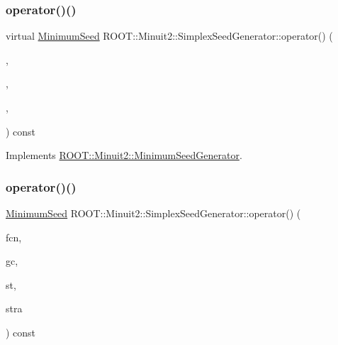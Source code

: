 \subsubsection{\texorpdfstring{operator()()}{operator()()}\hspace{0.1cm}{\footnotesize\ttfamily [4/6]}}
{\footnotesize\ttfamily virtual \mbox{\hyperlink{classROOT_1_1Minuit2_1_1MinimumSeed}{Minimum\+Seed}} R\+O\+O\+T\+::\+Minuit2\+::\+Simplex\+Seed\+Generator\+::operator() (\begin{DoxyParamCaption}\item[{const \mbox{\hyperlink{classROOT_1_1Minuit2_1_1MnFcn}{Mn\+Fcn}} \&}]{,  }\item[{const \mbox{\hyperlink{classROOT_1_1Minuit2_1_1AnalyticalGradientCalculator}{Analytical\+Gradient\+Calculator}} \&}]{,  }\item[{const \mbox{\hyperlink{classROOT_1_1Minuit2_1_1MnUserParameterState}{Mn\+User\+Parameter\+State}} \&}]{,  }\item[{const \mbox{\hyperlink{classROOT_1_1Minuit2_1_1MnStrategy}{Mn\+Strategy}} \&}]{ }\end{DoxyParamCaption}) const\hspace{0.3cm}{\ttfamily [virtual]}}



Implements \mbox{\hyperlink{classROOT_1_1Minuit2_1_1MinimumSeedGenerator_a670b9671c73d7e0d3caa148e82d4b2fa}{R\+O\+O\+T\+::\+Minuit2\+::\+Minimum\+Seed\+Generator}}.

\mbox{\label{classROOT_1_1Minuit2_1_1SimplexSeedGenerator_abce591c5a1e1aa0882dd5b474530efce}} 
\subsubsection{\texorpdfstring{operator()()}{operator()()}\hspace{0.1cm}{\footnotesize\ttfamily [5/6]}}
{\footnotesize\ttfamily \mbox{\hyperlink{classROOT_1_1Minuit2_1_1MinimumSeed}{Minimum\+Seed}} R\+O\+O\+T\+::\+Minuit2\+::\+Simplex\+Seed\+Generator\+::operator() (\begin{DoxyParamCaption}\item[{const \mbox{\hyperlink{classROOT_1_1Minuit2_1_1MnFcn}{Mn\+Fcn}} \&}]{fcn,  }\item[{const \mbox{\hyperlink{classROOT_1_1Minuit2_1_1AnalyticalGradientCalculator}{Analytical\+Gradient\+Calculator}} \&}]{gc,  }\item[{const \mbox{\hyperlink{classROOT_1_1Minuit2_1_1MnUserParameterState}{Mn\+User\+Parameter\+State}} \&}]{st,  }\item[{const \mbox{\hyperlink{classROOT_1_1Minuit2_1_1MnStrategy}{Mn\+Strategy}} \&}]{stra }\end{DoxyParamCaption}) const\hspace{0.3cm}{\ttfamily [virtual]}}



